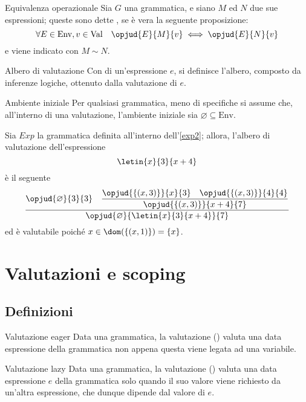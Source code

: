 \documentclass[a4paper, 12pt]{report}
\begin{document}
    \begin{frameddefn}{Equivalenza operazionale}
        Sia $G$ una grammatica, e siano $M$ ed $N$ due sue espressioni; queste sono dette , se è vera la seguente proposizione: $$\forall E \in \mathrm{Env}, v \in \mathrm{Val} \quad \opjud{E}{M}{v} \iff \opjud{E}{N}{v}$$ e viene indicato con $M \sim N$.
    \end{frameddefn}

    \begin{frameddefn}{Albero di valutazione}
        Con  di un'espressione $e$, si definisce l'albero, composto da inferenze logiche, ottenuto dalla valutazione di $e$.
    \end{frameddefn}

    \begin{framedobs}{Ambiente iniziale}
        Per qualsiasi grammatica, meno di specifiche si assume che, all'interno di una valutazione, l'ambiente iniziale sia $\varnothing \subseteq \mathrm{Env}$.
    \end{framedobs}

    \begin{example}
        Sia $Exp$ la grammatica definita all'interno dell'\cref{exp2}; allora, l'albero di valutazione dell'espressione $$\letin{x}{3}{x + 4}$$ è il seguente $$\dfrac{\opjud{\varnothing}{3}{3} \quad \dfrac{\opjud{\{(x, 3)\}}{x}{3} \quad \opjud{\{(x,3)\}}{4}{4}}{\opjud{\{(x, 3)\}}{x +4}{7}}}{\opjud{\varnothing}{\letin{x}{3}{x +4}}{7}}$$ ed è valutabile poiché $x \in \dom(\{(x,1)\}) = \{x\}$.
    \end{example}

    \section{Valutazioni e scoping}

    \subsection{Definizioni}

    \begin{frameddefn}{Valutazione eager}
        Data una grammatica, la valutazione  () valuta una data espressione della grammatica non appena questa viene legata ad una variabile.
    \end{frameddefn}

    \begin{frameddefn}{Valutazione lazy}
        Data una grammatica, la valutazione  () valuta una data espressione $e$ della grammatica solo quando il suo valore viene richiesto da un'altra espressione, che dunque dipende dal valore di $e$.
    \end{frameddefn}
\end{document}
